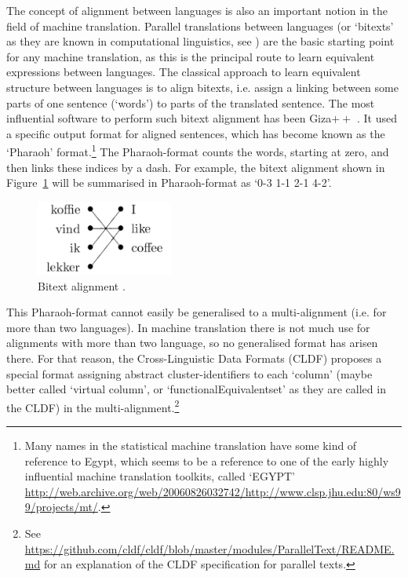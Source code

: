 \documentclass[11pt]{article}
\begin{document}
The concept of alignment between languages is also an important notion in the field of machine translation. Parallel translations between languages (or `bitexts' as they are known in computational linguistics, see \cite{tiedemann2011}) are the basic starting point for any machine translation, as this is the principal route to learn equivalent expressions between languages. The classical approach to learn equivalent structure between languages is to align bitexts, i.e. assign a linking between some parts of one sentence (`words') to parts of the translated sentence. The most influential software to perform such bitext alignment has been Giza$++$ \parencite{och2003}. It used a specific output format for aligned sentences, which has become known as the `Pharaoh' format.\footnote{Many names in the statistical machine translation have some kind of reference to Egypt, which seems to be a reference to one of the early highly influential machine translation toolkits, called `EGYPT' \url{http://web.archive.org/web/20060826032742/http://www.clsp.jhu.edu:80/ws99/projects/mt/}.} The Pharaoh-format counts the words, starting at zero, and then links these indices by a dash. For example, the bitext alignment shown in Figure~\ref{fig:bitext_tiedemann} will be summarised in Pharaoh-format as `0-3 1-1 2-1 4-2'.

\begin{figure}[htbp]
  \centering
  \includegraphics[width=0.4\textwidth]{images/bitext_tiedemann.png}
  \caption{Bitext alignment \parencite[4]{tiedemann2011}.}
  \label{fig:bitext_tiedemann}
\end{figure}

This Pharaoh-format cannot easily be generalised to a multi-alignment (i.e. for more than two languages). In machine translation there is not much use for alignments with more than two language, so no generalised format has arisen there. For that reason, the Cross-Linguistic Data Formats (CLDF) proposes a special format assigning  abstract cluster-identifiers to each `column' (maybe better called `virtual column', or `functionalEquivalentset' as they are called in the CLDF) in the multi-alignment.\footnote{See \url{https://github.com/cldf/cldf/blob/master/modules/ParallelText/README.md} for an explanation of the CLDF specification for parallel texts.}
\end{document}
